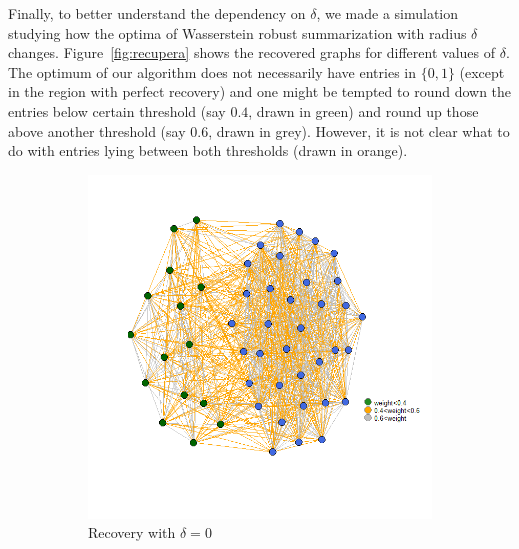 \documentclass[12pt]{amsart}
\theoremstyle{remark}
\begin{document}
Finally, to better understand the dependency on $\delta$, we made a simulation studying how the optima of Wasserstein robust summarization with radius $\delta$ changes. Figure~\ref{fig:recupera} shows the recovered graphs for different values of $\delta$. The optimum of our algorithm does not necessarily have entries in $\{0,1\}$ (except in the region with perfect recovery) and one might be tempted to round down the entries below certain threshold (say $0.4$, drawn in green) and round up those above another threshold (say $0.6$, drawn in grey). However, it is not clear what to do with entries lying between both thresholds (drawn in orange). 

\begin{figure}[H]
     \centering
     \begin{subfigure}[b]{0.35\textwidth}
         \centering
         \includegraphics[width=\textwidth]{./Pictures/recupera0.png}
         \caption{Recovery with $\delta=0$}
     \end{subfigure}
     \hfill
     \begin{subfigure}[b]{0.37\textwidth}
         \centering

\end{subfigure}
\end{figure}
\end{document}
